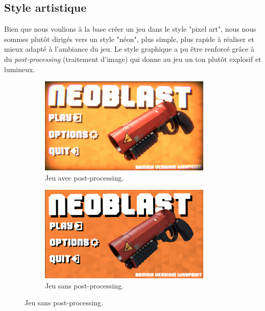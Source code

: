 \documentclass[a4paper]{article}
\begin{document}
\subsection{Style artistique}
\label{artstyle}
Bien que nous voulions à la base créer un jeu dans le style "pixel art", nous nous sommes plutôt dirigés vers un style "néon", plus simple, plus rapide à réaliser et mieux adapté à l'ambiance du jeu. Le style graphique a pu être renforcé grâce à du \textit{post-processing} (traitement d'image) qui donne au jeu un ton plutôt explosif et lumineux.

\begin{figure}[h]
    \begin{subfigure}{0.5\textwidth}
        \includegraphics[width=0.9\textwidth]{images/game/start_menu.png}
        \caption{Jeu avec post-processing.}
        \label{fig:post_processing}
    \end{subfigure}
        \begin{subfigure}{0.5\textwidth}
        \includegraphics[width=0.9\textwidth]{images/game/no_postfx.png}
        \caption{Jeu sans post-processing.}
        \label{fig:no_post_processing}
    \end{subfigure}
\end{figure}
\end{document}

